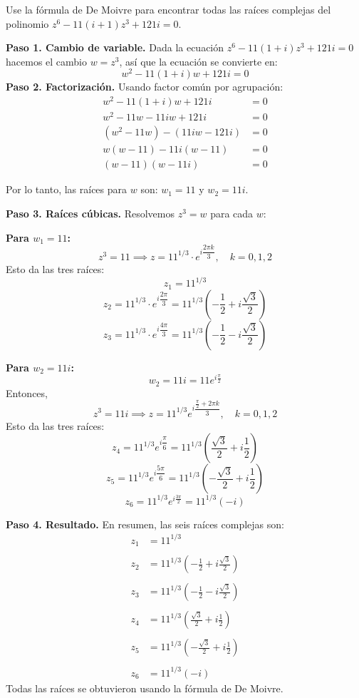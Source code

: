\begin{prob}Use la fórmula de De Moivre para encontrar todas las raíces complejas del polinomio $z^6-11(i+1)z^3+121i=0$.
\begin{myproof}
\textbf{Paso 1. Cambio de variable.} Dada la ecuación \(
z^6 - 11(1+i)z^3 + 121i = 0
\) hacemos el cambio $w = z^3$, así que la ecuación se convierte en:
\[
w^2 - 11(1+i)w + 121i = 0
\]
\textbf{Paso 2. Factorización.} Usando factor común por agrupación: \begin{align*}
w^2 - 11(1+i)w + 121i &= 0 \\
w^2 - 11w - 11iw + 121i &= 0 \\
(w^2 - 11w) - (11iw - 121i) &= 0 \\
w(w - 11) -11i(w - 11) &= 0 \\
(w - 11)(w - 11i) &= 0
\end{align*}

Por lo tanto, las raíces para $w$ son: \(
w_1 = 11 \) y \(w_2 = 11i.\)

\textbf{Paso 3. Raíces cúbicas.} Resolvemos $z^3 = w$ para cada $w$:

\textbf{Para $w_1 = 11$:}
\[
z^3 = 11 \implies z = 11^{1/3} \cdot e^{i\dfrac{2\pi k}{3}}, \quad k=0,1,2
\]
Esto da las tres raíces:
\[
z_1 = 11^{1/3}
\]
\[
z_2 = 11^{1/3} \cdot e^{i\dfrac{2\pi}{3}} = 11^{1/3} \left(-\frac{1}{2} + i\frac{\sqrt{3}}{2}\right)
\]
\[
z_3 = 11^{1/3} \cdot e^{i\dfrac{4\pi}{3}} = 11^{1/3} \left(-\frac{1}{2} - i\frac{\sqrt{3}}{2}\right)
\]

\textbf{Para $w_2 = 11i$:}
\[
w_2 = 11i = 11 e^{i\frac{\pi}{2}}
\]
Entonces,
\[
z^3 = 11i \implies z = 11^{1/3} e^{i\dfrac{\frac{\pi}{2} + 2\pi k}{3}}, \quad k=0,1,2
\]
Esto da las tres raíces:
\[
z_4 = 11^{1/3} e^{i\dfrac{\pi}{6}} = 11^{1/3} \left(\frac{\sqrt{3}}{2} + i\frac{1}{2}\right)
\]
\[
z_5 = 11^{1/3} e^{i\dfrac{5\pi}{6}} = 11^{1/3} \left(-\frac{\sqrt{3}}{2} + i\frac{1}{2}\right)
\]
\[
z_6 = 11^{1/3} e^{i\frac{3\pi}{2}} = 11^{1/3} (-i)
\]

\textbf{Paso 4. Resultado.} En resumen, las seis raíces complejas son:
\[
\boxed{
\begin{aligned}
z_1 &= 11^{1/3} \\\\
z_2 &= 11^{1/3} \left(-\frac{1}{2} + i\frac{\sqrt{3}}{2}\right) \\\\
z_3 &= 11^{1/3} \left(-\frac{1}{2} - i\frac{\sqrt{3}}{2}\right) \\\\
z_4 &= 11^{1/3} \left(\frac{\sqrt{3}}{2} + i\frac{1}{2}\right) \\\\
z_5 &= 11^{1/3} \left(-\frac{\sqrt{3}}{2} + i\frac{1}{2}\right) \\\\
z_6 &= 11^{1/3} (-i)
\end{aligned}
}
\]
Todas las raíces se obtuvieron usando la fórmula de De Moivre.
\end{myproof}
\end{prob}

